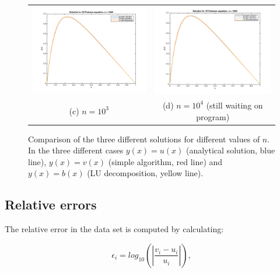 \documentclass{article}
\begin{document}
\begin{multicols}{2}
\begin{figure}
\begin{center}
\begin{tabular}{cc}
 	\includegraphics[width=90mm]{../build-Project1-Desktop_Qt_5_5_0_clang_64bit-Debug/Plot_n1000.png} 	
	& \includegraphics[width=90mm]{../build-Project1-Desktop_Qt_5_5_0_clang_64bit-Debug/Plot_n1000.png} \\
	(c) $n = 10^3$ 								& (d) $n = 10^4$ (still waiting on program) \\[6pt]
	
\end{tabular}
\caption{Comparison of the three different solutions for different values of $n$. In the three different cases $y(x) = u(x)$ (analytical solution, blue line), $y(x) = v(x)$ (simple algorithm, red line) and $y(x) = b(x)$ (LU decomposition, yellow line).}\label{fig:n-values}
\end{center}
\end{figure}


\subsection{Relative errors}

The relative error in the data set is computed by calculating:

\begin{equation}
   \epsilon_i=log_{10}\left(\left|\frac{v_i-u_i}
                 {u_i}\right|\right),
\end{equation}


\end{multicols}
\end{document}
